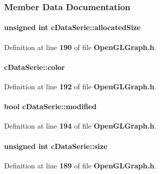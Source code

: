 \subsubsection{Member Data Documentation}
\paragraph[{allocated\+Size}]{\setlength{\rightskip}{0pt plus 5cm}unsigned {\bf int} c\+Data\+Serie\+::allocated\+Size}\label{classcDataSerie_a726451e3c83d825edaff8782a5cafe2e}


Definition at line {\bf 190} of file {\bf Open\+G\+L\+Graph.\+h}.

\paragraph[{color}]{ c\+Data\+Serie\+::color}\label{classcDataSerie_ad92cc065e1b8ce0c70d3f29b75cf4060}


Definition at line {\bf 192} of file {\bf Open\+G\+L\+Graph.\+h}.

\paragraph[{modified}]{\setlength{\rightskip}{0pt plus 5cm}bool c\+Data\+Serie\+::modified}\label{classcDataSerie_a7297fec9acca73b6d7b936a20fa14212}


Definition at line {\bf 194} of file {\bf Open\+G\+L\+Graph.\+h}.

\paragraph[{size}]{\setlength{\rightskip}{0pt plus 5cm}unsigned {\bf int} c\+Data\+Serie\+::size}\label{classcDataSerie_a02ff3096f4595648e01304437986af0a}


Definition at line {\bf 189} of file {\bf Open\+G\+L\+Graph.\+h}.

